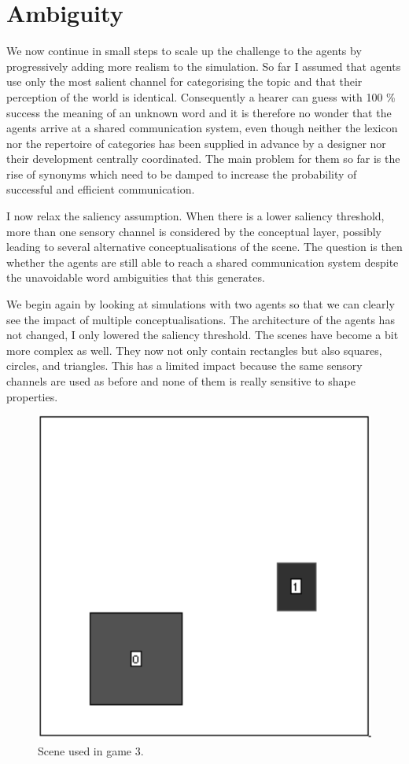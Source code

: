 \section{Ambiguity} 

We now continue in small steps to scale up the
challenge to the agents by progressively 
adding more realism to the simulation. So far I 
assumed that agents use only 
the most salient channel for categorising the topic
and that their perception of the world is identical.
Consequently a hearer can guess with 100 \% success the
meaning of an unknown word and 
it is therefore no wonder that the agents arrive at a 
shared communication system, 
even though neither the lexicon nor the repertoire
of categories has been supplied in advance by a 
designer nor their development centrally
coordinated. The main problem for them so far is 
the rise of synonyms which need to be damped to 
increase the probability of successful and 
efficient communication. 

I now relax the saliency assumption. When 
there is a lower saliency threshold, more than one
sensory channel is considered by the conceptual 
layer, possibly leading to several alternative
conceptualisations of the scene. The question is 
then whether the agents are still able to reach 
a shared communication system despite the unavoidable
word ambiguities that this generates. 

We begin again by looking at simulations
with two agents so that we 
can clearly see the impact of multiple conceptualisations. 
The architecture of the agents has not changed, I only 
lowered the saliency threshold. 
The scenes have become a bit more complex as well. They 
now not only contain rectangles but also squares, circles, 
and triangles. This has a limited impact because the 
same sensory channels are used as before and none of them 
is really sensitive to shape properties. 


\begin{figure}[htbp]
  \centerline{\includegraphics[width=.40\textwidth]{chap6/figs/scene-game3.pdf}}
\caption{\label{scene-game3}Scene used
in game 3.}
\end{figure}


